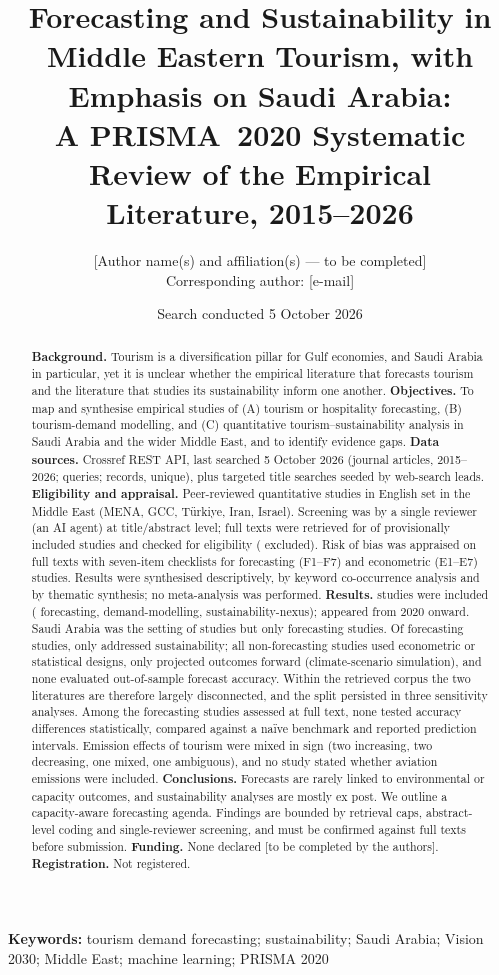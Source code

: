 \documentclass[11pt,a4paper]{article}
\title{Forecasting and Sustainability in Middle Eastern Tourism, with Emphasis on Saudi Arabia:\\ A PRISMA~2020 Systematic Review of the Empirical Literature, 2015--2026}
\author{[Author name(s) and affiliation(s) --- to be completed]\\ \small Corresponding author: [e-mail]}
\date{Search conducted 5 October 2026}
\begin{document}
\maketitle

\begin{abstract}
\noindent\textbf{Background.} Tourism is a diversification pillar for Gulf economies, and Saudi Arabia in particular, yet it is unclear whether the empirical literature that forecasts tourism and the literature that studies its sustainability inform one another.
\textbf{Objectives.} To map and synthesise empirical studies of (A) tourism or hospitality forecasting, (B) tourism-demand modelling, and (C) quantitative tourism--sustainability analysis in Saudi Arabia and the wider Middle East, and to identify evidence gaps.
\textbf{Data sources.} Crossref REST API, last searched 5 October 2026 (journal articles, 2015--2026; \Nqueries{} queries; \Nretrieved{} records, \Nunique{} unique), plus targeted title searches seeded by web-search leads.
\textbf{Eligibility and appraisal.} Peer-reviewed quantitative studies in English set in the Middle East (MENA, GCC, T\"urkiye, Iran, Israel). Screening was by a single reviewer (an AI agent) at title/abstract level; full texts were retrieved for \Nftretr{} of \Nftsought{} provisionally included studies and checked for eligibility (\Nftexcl{} excluded). Risk of bias was appraised on full texts with seven-item checklists for forecasting (F1--F7) and econometric (E1--E7) studies. Results were synthesised descriptively, by keyword co-occurrence analysis and by thematic synthesis; no meta-analysis was performed.
\textbf{Results.} \Nincluded{} studies were included (\NnF{} forecasting, \NnD{} demand-modelling, \NnS{} sustainability-nexus); \Nyrecent{} appeared from 2020 onward. Saudi Arabia was the setting of \Nsaudiall{} studies but only \NsaudiF{} forecasting studies. Of \NnF{} forecasting studies, only \NFsust{} addressed sustainability; all \NnonFn{} non-forecasting studies used econometric or statistical designs, only \NnonFfut{} projected outcomes forward (climate-scenario simulation), and none evaluated out-of-sample forecast accuracy. Within the retrieved corpus the two literatures are therefore largely disconnected, and the split persisted in three sensitivity analyses. Among the \NftF{} forecasting studies assessed at full text, none tested accuracy differences statistically, \NrobFB{} compared against a na\"ive benchmark and \NrobFG{} reported prediction intervals. Emission effects of tourism were mixed in sign (two increasing, two decreasing, one mixed, one ambiguous), and no study stated whether aviation emissions were included.
\textbf{Conclusions.} Forecasts are rarely linked to environmental or capacity outcomes, and sustainability analyses are mostly ex post. We outline a capacity-aware forecasting agenda. Findings are bounded by retrieval caps, abstract-level coding and single-reviewer screening, and must be confirmed against full texts before submission.
\textbf{Funding.} None declared [to be completed by the authors]. \textbf{Registration.} Not registered.
\end{abstract}
\noindent\textbf{Keywords:} tourism demand forecasting; sustainability; Saudi Arabia; Vision 2030; Middle East; machine learning; PRISMA 2020
\end{document}
